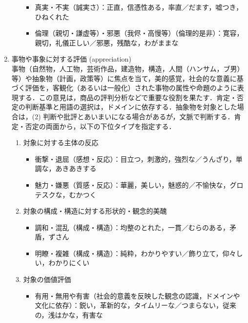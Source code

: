 \documentclass[japanese]{jnlp_1.4}
\begin{document}
\begin{enumerate}
\begin{enumerate}
\begin{itemize}
\item 真実・不実（誠実さ）：正直，信憑性ある，率直／だます，嘘つき，ひねくれた
\item 倫理（親切・謙虚等）・邪悪（我侭・高慢等）（倫理的是非）：寛容，親切，礼儀正しい／邪悪，残酷な，わがままな
\end{itemize}
\end{enumerate}

\item 事物や事象に対する評価 (appreciation)\\
事物（自然物，人工物，芸術作品，建造物，構造，人間（ハンサム，ブ男）等）や抽象物（計画，政策等）に焦点を当て，美的感覚，社会的な意義に基づく評価を，客観化（あるいは一般化）された事物の属性や命題のように表現する．この意見は，商品の評判分析などで重要な役割を果たす．肯定・否定の判断基準と用語の選択は，ドメインに依存する．抽象物を対象とした場合は，(2) 判断や批評とあいまいになる場合があるが，文脈で判断する．肯定・否定の両面から，以下の下位タイプを指定する．

\begin{enumerate}
\item 対象に対する主体の反応

\begin{itemize}
\item 衝撃・退屈（感想・反応）：目立つ，刺激的，強烈な／うんざり，単調な，あきあきする
\item 魅力・嫌悪（質感・反応）：華麗，美しい，魅惑的／不愉快な，グロテスクな，むかつく
\end{itemize}

\item 対象の構成・構造に対する形状的・観念的美醜

\begin{itemize}
\item 調和・混乱（構成・構造）：均整のとれた，一貫／むらのある，矛盾，ずさん
\item 明瞭・複雑（構成・構造）：純粋，わかりやすい／飾り立て，仰々しい，わかりにくい
\end{itemize}

\item 対象の価値評価

\begin{itemize}
\item 有用・無用や有害（社会的意義を反映した観念の認識，ドメインや文化に依存）：鋭い，革新的な，タイムリーな／つまらない，従来の，浅はかな，有害な
\end{itemize}
\end{enumerate}
\end{enumerate}
\end{document}

